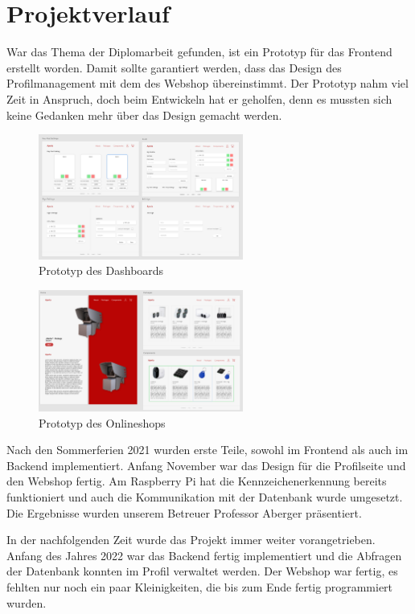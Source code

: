\section{Projektverlauf}
War das Thema der Diplomarbeit gefunden, ist ein Prototyp für das Frontend erstellt worden. Damit sollte garantiert werden, dass das Design des Profilmanagement mit dem des Webshop übereinstimmt. Der Prototyp nahm viel Zeit in Anspruch, doch beim Entwickeln hat er geholfen, denn es mussten sich keine Gedanken mehr über das Design gemacht werden.
\begin{figure}[H]
    \centering
    \includegraphics[width=0.6\textwidth]{pics/DashboardPrototyp.png}
    \caption{Prototyp des Dashboards}
  \end{figure}
  \begin{figure}[H]
    \centering
    \includegraphics[width=0.6\textwidth]{pics/ShopPrototyp.png}
    \caption{Prototyp des Onlineshops}
  \end{figure}

Nach den Sommerferien 2021 wurden erste Teile, sowohl im Frontend als auch im Backend implementiert. Anfang November war das Design für die Profilseite und den Webshop fertig. Am Raspberry Pi hat die Kennzeichenerkennung bereits funktioniert und auch die Kommunikation mit der Datenbank wurde umgesetzt. Die Ergebnisse wurden unserem Betreuer Professor Aberger präsentiert.

In der nachfolgenden Zeit wurde das Projekt immer weiter vorangetrieben.  Anfang des Jahres 2022 war das Backend fertig implementiert und die Abfragen der Datenbank konnten im Profil verwaltet werden. Der Webshop war fertig, es fehlten nur noch ein paar Kleinigkeiten, die bis zum Ende fertig programmiert wurden. 

